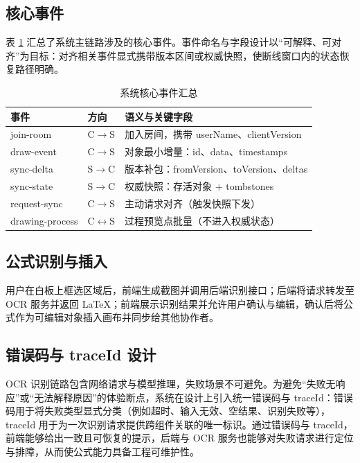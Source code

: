 \subsection{核心事件}
表 \ref{tab:events} 汇总了系统主链路涉及的核心事件。事件命名与字段设计以“可解释、可对齐”为目标：对齐相关事件显式携带版本区间或权威快照，使断线窗口内的状态恢复路径明确。

\begin{table}[htbp]
  \centering
  \caption{系统核心事件汇总}\label{tab:events}
  \renewcommand{\arraystretch}{1.35}
  \begin{tabular}{lll}
    \toprule
    \textbf{事件} & \textbf{方向} & \textbf{语义与关键字段} \\
    \midrule
    join-room & C$\rightarrow$S & 加入房间，携带 userName、clientVersion \\
    draw-event & C$\rightarrow$S & 对象最小增量：id、data、timestamps \\
    sync-delta & S$\rightarrow$C & 版本补包：fromVersion、toVersion、deltas \\
    sync-state & S$\rightarrow$C & 权威快照：存活对象 + tombstones \\
    request-sync & C$\rightarrow$S & 主动请求对齐（触发快照下发） \\
    drawing-process & C$\leftrightarrow$S & 过程预览点批量（不进入权威状态） \\
    \bottomrule
  \end{tabular}
\end{table}

\subsection{公式识别与插入}
用户在白板上框选区域后，前端生成截图并调用后端识别接口；后端将请求转发至 OCR 服务并返回 LaTeX；前端展示识别结果并允许用户确认与编辑，确认后将公式作为可编辑对象插入画布并同步给其他协作者。

\subsection{错误码与 traceId 设计}
OCR 识别链路包含网络请求与模型推理，失败场景不可避免。为避免“失败无响应”或“无法解释原因”的体验断点，系统在设计上引入统一错误码与 traceId：错误码用于将失败类型显式分类（例如超时、输入无效、空结果、识别失败等），traceId 用于为一次识别请求提供跨组件关联的唯一标识。通过错误码与 traceId，前端能够给出一致且可恢复的提示，后端与 OCR 服务也能够对失败请求进行定位与排障，从而使公式能力具备工程可维护性。
